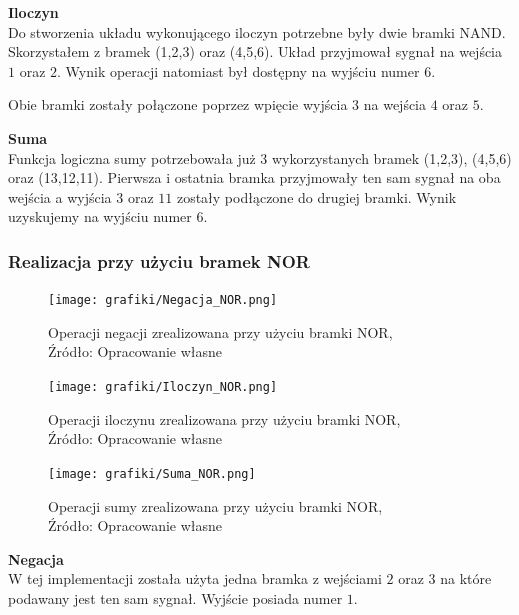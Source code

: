 \documentclass{article}
\begin{document}
        \textbf{Iloczyn} \\
        Do stworzenia układu wykonującego iloczyn potrzebne były dwie bramki NAND. Skorzystałem z bramek (1,2,3) oraz (4,5,6). Układ przyjmował sygnał na wejścia  $1$ oraz $2$. Wynik operacji natomiast był dostępny na wyjściu numer $6$.

        Obie bramki zostały połączone poprzez wpięcie wyjścia $3$ na wejścia $4$ oraz $5$.

        \textbf{Suma} \\
        Funkcja logiczna sumy potrzebowała już 3 wykorzystanych bramek (1,2,3), (4,5,6) oraz (13,12,11). Pierwsza i ostatnia bramka przyjmowały ten sam sygnał na oba wejścia a wyjścia $3$ oraz $11$ zostały podłączone do drugiej bramki. Wynik uzyskujemy na wyjściu numer $6$.
        \pagebreak

        \subsubsection{Realizacja przy użyciu bramek NOR}

        \begin{figure}[!ht]
          \begin{minipage}{.33\textwidth}
            \centering
            \texttt{[image: grafiki/Negacja\_NOR.png]}
            \caption{Operacji negacji zrealizowana przy użyciu bramki NOR,
            \\Źródło: Opracowanie własne}
          \end{minipage}
          \begin{minipage}{.33\textwidth}
            \centering
            \texttt{[image: grafiki/Iloczyn\_NOR.png]}
            \caption{Operacji iloczynu zrealizowana przy użyciu bramki NOR,
            \\Źródło: Opracowanie własne}
          \end{minipage}
          \begin{minipage}{.33\textwidth}
            \centering
            \texttt{[image: grafiki/Suma\_NOR.png]}
            \caption{Operacji sumy zrealizowana przy użyciu bramki NOR,
            \\Źródło: Opracowanie własne}
          \end{minipage}
        \end{figure}
        \textbf{Negacja} \\
        W tej implementacji została użyta jedna bramka z wejściami $2$ oraz $3$ na które podawany jest ten sam sygnał. Wyjście posiada numer $1$.
\end{document}
